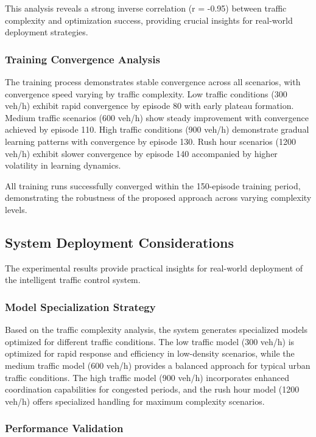 This analysis reveals a strong inverse correlation (r = -0.95) between traffic complexity and optimization success, providing crucial insights for real-world deployment strategies.

\subsubsection{Training Convergence Analysis}

The training process demonstrates stable convergence across all scenarios, with convergence speed varying by traffic complexity. Low traffic conditions (300 veh/h) exhibit rapid convergence by episode 80 with early plateau formation. Medium traffic scenarios (600 veh/h) show steady improvement with convergence achieved by episode 110. High traffic conditions (900 veh/h) demonstrate gradual learning patterns with convergence by episode 130. Rush hour scenarios (1200 veh/h) exhibit slower convergence by episode 140 accompanied by higher volatility in learning dynamics.

All training runs successfully converged within the 150-episode training period, demonstrating the robustness of the proposed approach across varying complexity levels.

\subsection{System Deployment Considerations}\label{subsec2b-5}

The experimental results provide practical insights for real-world deployment of the intelligent traffic control system.

\subsubsection{Model Specialization Strategy}

Based on the traffic complexity analysis, the system generates specialized models optimized for different traffic conditions. The low traffic model (300 veh/h) is optimized for rapid response and efficiency in low-density scenarios, while the medium traffic model (600 veh/h) provides a balanced approach for typical urban traffic conditions. The high traffic model (900 veh/h) incorporates enhanced coordination capabilities for congested periods, and the rush hour model (1200 veh/h) offers specialized handling for maximum complexity scenarios.

\subsubsection{Performance Validation}

